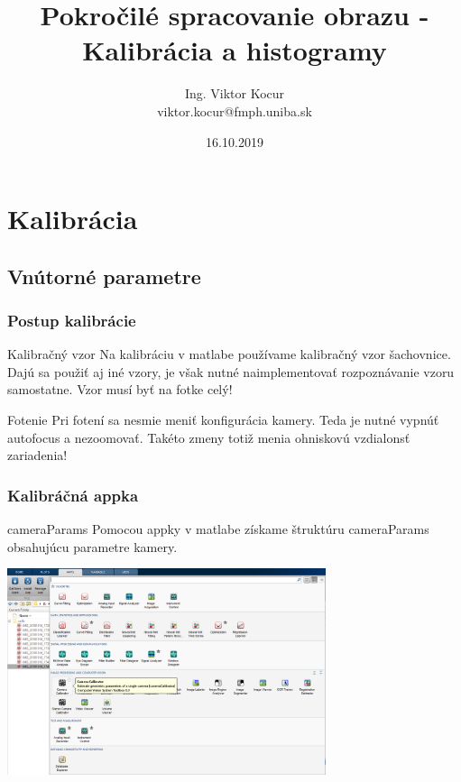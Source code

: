 \documentclass{beamer}
\title[4. cvičenie]{Pokročilé spracovanie obrazu - Kalibrácia a histogramy}
\author[Kocur]{Ing. Viktor Kocur \\{\small viktor.kocur@fmph.uniba.sk}}
\institute{DAI FMFI UK}
\date{16.10.2019}
\begin{document}

\begin{frame}
  \titlepage
\end{frame}

\section{Kalibrácia}
\subsection{Vnútorné parametre}
\begin{frame}
\frametitle{Postup kalibrácie}
\begin{block}{Kalibračný vzor}
Na kalibráciu v matlabe používame kalibračný vzor šachovnice. Dajú sa použiť aj iné vzory, je však nutné naimplementovať rozpoznávanie vzoru samostatne. Vzor musí byť na fotke celý!
\end{block}

\begin{alertblock}{Fotenie}
Pri fotení sa nesmie meniť konfigurácia kamery. Teda je nutné vypnúť autofocus a nezoomovať. Takéto zmeny totiž menia ohniskovú vzdialonsť zariadenia!
\end{alertblock}
\end{frame}

\begin{frame}
\frametitle{Kalibráčná appka}
\begin{block}{cameraParams}
Pomocou appky v matlabe získame štruktúru cameraParams obsahujúcu parametre kamery.
\end{block}

\begin{center}
\includegraphics[width=0.7\textwidth]{calib_app.png}
\end{center}
\end{frame}
\end{document}
